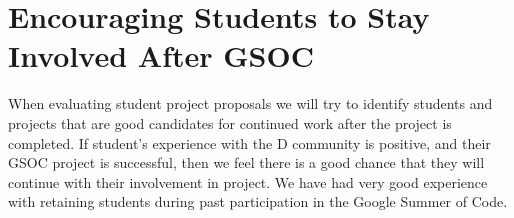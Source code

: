 \documentclass[	DIV=calc,paper=a4,fontsize=11pt,twocolumn]{scrartcl}	%
\begin{document}
\section{Encouraging Students to Stay Involved After GSOC}


When evaluating student project proposals we will try to identify
students and projects that are good candidates for continued work
after the project is completed.  If student's experience with the 
D community is positive, and their GSOC project is successful, then
we feel there is a good chance that they will continue with their
involvement in project. We have had very good experience with retaining
students during past participation in the Google Summer of Code.     
\end{document}
